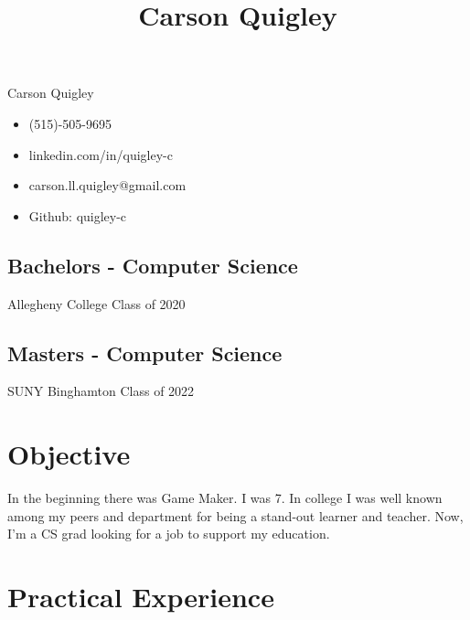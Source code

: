 \documentclass[12pt]{article}
\title{Carson Quigley}
\date{}
\begin{document}
\pagestyle{empty}

\begin{multicols}{3}

\begingroup
    \LARGE Carson Quigley\\[0em]
\endgroup

\vfill\null

\begin{itemize}
    \item[] (515)-505-9695
    \item[] linkedin.com/in/quigley-c

\vfill\null

    \item[] carson.ll.quigley@gmail.com
    \item[] Github: quigley-c

\vfill\null

\end{itemize}
\end{multicols}

\vspace{-1.5em}
\noindent\makebox[\linewidth]{\rule{\paperwidth}{0.4pt}}

\begingroup
\centering
\begin{multicols}{2}
\subsection*{Bachelors - Computer Science}
Allegheny College Class of 2020

\subsection*{Masters - Computer Science}
SUNY Binghamton Class of 2022

\end{multicols}
\endgroup

\begingroup
\centering
\section*{Objective}
In the beginning there was Game Maker. I was 7. In college I was well known among
my peers and department for being a stand-out learner and teacher. Now, I'm a CS
grad looking for a job to support my education.
\endgroup


\section*{Practical Experience}
\end{document}
